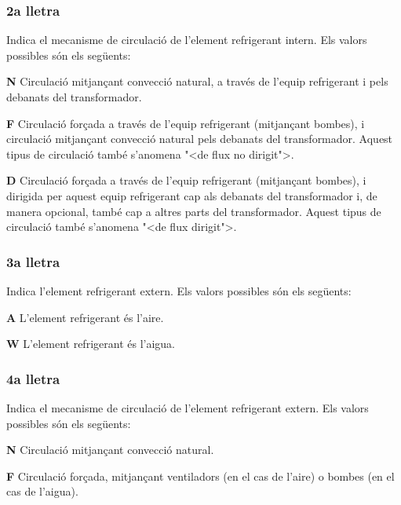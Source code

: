 \subsubsection*{2a lletra}
Indica el mecanisme de circulaci\'{o} de l'element
refrigerant intern. Els valors possibles s\'{o}n els seg\"{u}ents:

\begin{list}{}
   {\setlength{\labelwidth}{10mm} \setlength{\leftmargin}{10mm} \setlength{\labelsep}{2mm}}
   \item[\textbf{N}] Circulaci\'{o} mitjan\c{c}ant convecci\'{o} natural,
    a trav\'{e}s de l'equip refrigerant i pels debanats del transformador.
   \item[\textbf{F}] Circulaci\'{o} for\c{c}ada a trav\'{e}s de l'equip refrigerant (mitjan\c{c}ant bombes),
    i circulaci\'{o} mitjan\c{c}ant convecci\'{o} natural pels debanats del
    transformador. Aquest tipus de circulaci\'{o} tamb\'{e} s'anomena {"<}de flux no
    dirigit{">}.
   \item[\textbf{D}] Circulaci\'{o} for\c{c}ada a trav\'{e}s de l'equip refrigerant (mitjan\c{c}ant bombes),
    i dirigida per aquest equip refrigerant cap als debanats del
    transformador i, de manera opcional, tamb\'{e} cap a altres parts del transformador. Aquest
    tipus de circulaci\'{o} tamb\'{e} s'anomena {"<}de flux dirigit{">}.
\end{list}
  

\subsubsection*{3a lletra}
 Indica l'element refrigerant extern. Els valors
possibles s\'{o}n els seg\"{u}ents:

\begin{list}{}
   {\setlength{\labelwidth}{10mm} \setlength{\leftmargin}{10mm} \setlength{\labelsep}{2mm}}
   \item[\textbf{A}] L'element refrigerant \'{e}s l'aire.
   \item[\textbf{W}] L'element refrigerant \'{e}s l'aigua.
\end{list}
 

\subsubsection*{4a lletra}
 Indica el mecanisme de circulaci\'{o} de l'element
refrigerant extern. Els valors possibles s\'{o}n els seg\"{u}ents:
\begin{list}{}
   {\setlength{\labelwidth}{10mm} \setlength{\leftmargin}{10mm} \setlength{\labelsep}{2mm}}
   \item[\textbf{N}] Circulaci\'{o} mitjan\c{c}ant convecci\'{o} natural.
   \item[\textbf{F}] Circulaci\'{o} for\c{c}ada, mitjan\c{c}ant ventiladors (en el cas de
   l'aire) o bombes (en el cas de l'aigua).
\end{list}
 

